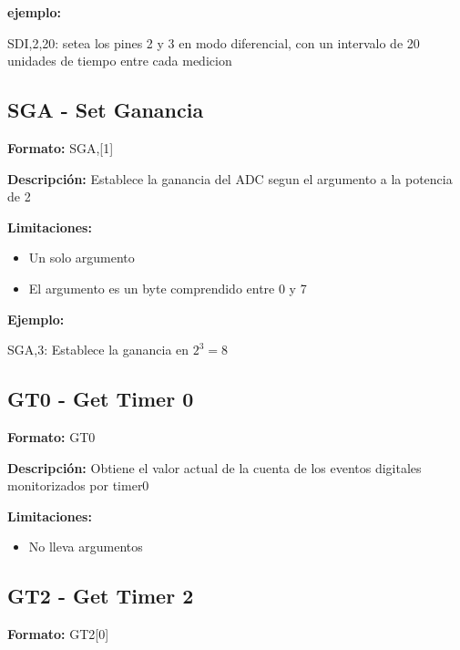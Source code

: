 \textbf{ejemplo:}

SDI,2,20: setea los pines 2 y 3 en modo diferencial, con un intervalo de 20 unidades de tiempo entre cada medicion


\subsection{SGA - Set Ganancia} %
\label{sub:sga_set_ganancia}


\textbf{Formato:} SGA,[1]

\textbf{Descripci\'on:}
Establece la ganancia del ADC segun el argumento a la potencia de 2

\textbf{Limitaciones:}
\begin{itemize}
  \item Un solo argumento
  \item El argumento es un byte comprendido entre 0 y 7
\end{itemize}

\textbf{Ejemplo:}

SGA,3: Establece la ganancia en $2^{3} = 8$


\subsection{GT0 - Get Timer 0} %
\label{sub:gt0_get_timer_0}


\textbf{Formato:} GT0

\textbf{Descripci\'on:}
Obtiene el valor actual de la cuenta de los eventos digitales monitorizados por timer0

\textbf{Limitaciones:}
\begin{itemize}
  \item No lleva argumentos
\end{itemize}


\subsection{GT2 - Get Timer 2} %
\label{sub:gt2_get_timer_2}

\textbf{Formato:} GT2[0]

